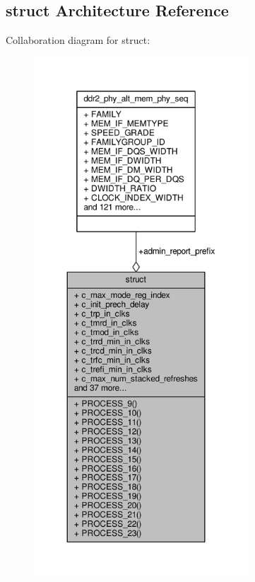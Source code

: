 \subsection{struct Architecture Reference}
\label{classddr2__phy__alt__mem__phy__admin_1_1struct}


Collaboration diagram for struct\+:\nopagebreak
\begin{figure}[H]
\begin{center}
\leavevmode
\includegraphics[height=550pt]{d9/d64/classddr2__phy__alt__mem__phy__admin_1_1struct__coll__graph}
\end{center}
\end{figure}
